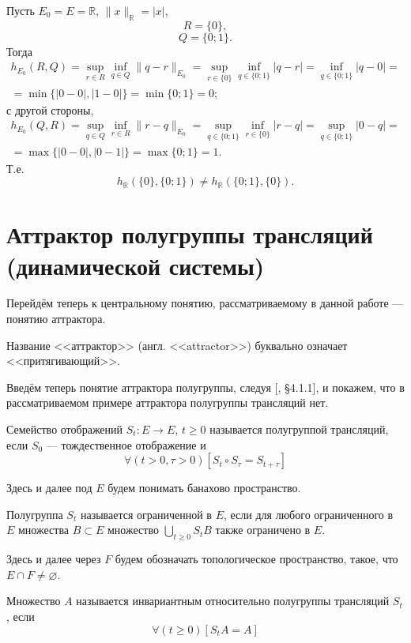 Пусть $E_0 = E = \mathbb{R}$, $\|x\|_{\mathbb{R}} = |x|$,
$$
	R =\{0\},
$$
$$
	Q=\{0;1\}.
$$
Тогда
\begin{multline*}
	h_{E_0}(R,Q) =
	\sup_{r\in R} \inf_{q \in Q} \| q - r \|_{E_0} =
	\sup_{r\in \{0\}} \inf_{q \in \{0;1\}} | q - r | =
	\inf_{q \in \{0;1\}} | q - 0 | =
	\\ =
	\min\{|0-0|,|1-0|\} =
	\min\{0;1\} =
	0;
\end{multline*}
с другой стороны,
\begin{multline*}
	h_{E_0}(Q,R) =
	\sup_{q \in Q} \inf_{r\in R} \| r - q \|_{E_0} =
	\sup_{q \in \{0;1\}} \inf_{r\in \{0\}} | r - q | =
	\sup_{q \in \{0;1\}} | 0 - q | =
	\\ =
	\max\{|0-0|,|0-1|\} =
	\max\{0;1\} =
	1.
\end{multline*}
Т.е.
$$
	h_{\mathbb{R}}\left( \{0\}, \{0;1\}\right) \neq h_{\mathbb{R}}\left( \{0;1\} , \{0\} \right).
$$


\section{Аттрактор полугруппы трансляций (динамической системы)}

Перейдём теперь к центральному понятию, рассматриваемому в данной работе --- понятию аттрактора.

Название <<аттрактор>> (англ. <<attractor>>) буквально означает <<притягивающий>>.



Введём теперь понятие аттрактора полугруппы, следуя [\cite{Vorotnikov}, \S 4.1.1],
и покажем, что в рассматриваемом примере аттрактора полугруппы трансляций нет.

\opred

Семейство отображений $S_t : E \to E$, $t \geq 0$ называется полугруппой трансляций,
если $S_0$ --- тождественное отображение и
$$
	\forall(t>0,\tau>0)[S_t \circ S_\tau = S_{t+\tau}]
$$

Здесь и далее под $E$ будем понимать банахово пространство.

\opred

Полугруппа $S_t$ называется ограниченной в $E$, если для любого ограниченного в $E$ множества $B \subset E$ множество $\bigcup\limits_{t\geq0}S_t B$ также ограничено в $E$.

Здесь и далее через $F$ будем обозначать топологическое пространство, такое, что $E \cap F \ne \varnothing$.

\opred

Множество $A$ называется инвариантным относительно полугруппы трансляций $S_t$, если
$$
	\forall(t\geq 0)[S_t A = A]
$$

